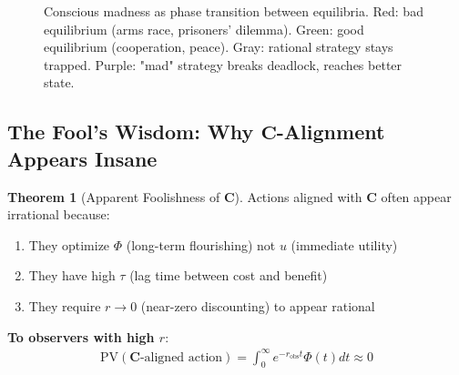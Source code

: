 \documentclass[11pt,a4paper]{article}
\theoremstyle{definition}
\newtheorem{theorem}{Theorem}[section]
\theoremstyle{remark}
\begin{document}
\begin{small}
\begin{enumerate}
\begin{figure}[H]
\caption{Conscious madness as phase transition between equilibria. Red: bad equilibrium (arms race, prisoners' dilemma). Green: good equilibrium (cooperation, peace). Gray: rational strategy stays trapped. Purple: "mad" strategy breaks deadlock, reaches better state.}
\label{fig:madness_wisdom}
\end{figure}

\subsection{The Fool's Wisdom: Why \(\mathbf{C}\)-Alignment Appears Insane}

\begin{theorem}[Apparent Foolishness of \(\mathbf{C}\)]
Actions aligned with \(\mathbf{C}\) often appear irrational because:

\begin{enumerate}
    \item They optimize \(\Phi\) (long-term flourishing) not \(u\) (immediate utility)
    \item They have high \(\tau\) (lag time between cost and benefit)
    \item They require \(r \to 0\) (near-zero discounting) to appear rational
\end{enumerate}

\textbf{To observers with high \(r\)}:
\begin{align}
\text{PV}(\mathbf{C}\text{-aligned action}) = \int_0^\infty e^{-r_{\text{obs}} t} \Phi(t) dt \approx 0
\end{align}


\end{theorem}
\end{enumerate}
\end{small}
\end{document}
